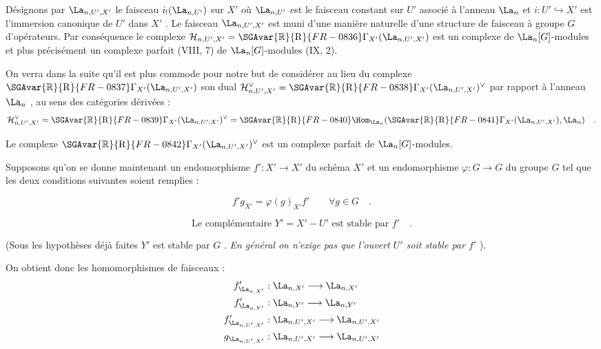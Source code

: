 Désignons par $\La_{n,U',X'}$ le faisceau $i_!(\La_{n,U'})$ sur $X'$ où $\La_{n,U'}$ est le faisceau constant sur $U'$ associé à l'anneau $\La_n$ et $i : U' \hookrightarrow X'$ est l'immersion canonique de $U'$ dans $X'$ . Le faisceau $\La_{n,U',X'}$ est muni d'une manière naturelle d'une structure de faisceau à groupe $G$ d'opérateurs. Par conséquence le complexe $\mathcal{H}_{n,U',X'} = \SGAvar{\mathbb{R}}{\mathrm{R}}{FR-0836}\Gamma_{X'}(\La_{n,U',X'})$ est un complexe de $\La_n[G]$-modules
et plus précisément un complexe parfait (VIII, 7) de $\La_n[G]$-modules (IX, 2).

On verra dans la suite qu'il est plus commode pour notre but de considérer au lieu du complexe $\SGAvar{\mathbb{R}}{\mathrm{R}}{FR-0837}\Gamma_{X'}(\La_{n,U',X'})$ son dual $\mathcal{H}_{n,U',X'}^\vee = \SGAvar{\mathbb{R}}{\mathrm{R}}{FR-0838}\Gamma_{X'}(\La_{n,U',X'})^\vee$ par rapport à l'anneau $\La_n$ , au sens des catégories dérivées :
\[
\mathcal{H}_{n,U',X'}^\vee = \SGAvar{\mathbb{R}}{\mathrm{R}}{FR-0839}\Gamma_{X'}(\La_{n,U',X'})^\vee = \SGAvar{\mathbb{R}}{\mathrm{R}}{FR-0840}\Hom_{\La_n}(\SGAvar{\mathbb{R}}{\mathrm{R}}{FR-0841}\Gamma_{X'}(\La_{n,U',X'}), \La_n) \quad .
\]

Le complexe $\SGAvar{\mathbb{R}}{\mathrm{R}}{FR-0842}\Gamma_{X'}(\La_{n,U',X'})^\vee$ est un complexe parfait de $\La_n[G]$-modules.

Supposons qu'on se donne maintenant un endomorphisme $f' : X' \to X'$ du schéma $X'$ et un endomorphisme $\varphi : G \to G$ du groupe $G$ tel que les deux conditions suivantes soient remplies :

\begin{equation}\tag{1.1}
f' g_{X'} = \varphi(g)_{X'} f' \qquad \forall g \in G \quad .
\end{equation}

\begin{equation}\tag{1.2}
\text{Le complémentaire } Y' = X' - U' \text{ est stable par } f' \quad .
\end{equation}

(Sous les hypothèses déjà faites $Y'$ est stable par $G$ . \emph{En général on n'exige pas que l'ouvert $U'$ soit stable par $f'$} ).

On obtient donc les homomorphismes de faisceaux :
\begin{align*}
f'_{\La_{n,X'}} &: \La_{n,X'} \longrightarrow \La_{n,X'} \\
f'_{\La_{n,Y'}} &: \La_{n,Y'} \longrightarrow \La_{n,Y'} \\
f'_{\La_{n,U',X'}} &: \La_{n,U',X'} \longrightarrow \La_{n,U',X'} \\
g_{\La_{n,U',X'}} &: \La_{n,U',X'} \longrightarrow \La_{n,U',X'}
\end{align*}

